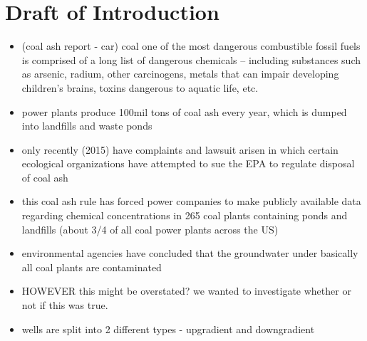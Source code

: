 \documentclass[12pt, twoside]{amherstthesis}
\begin{document}
\hypertarget{draft-of-introduction}{%
\section{Draft of Introduction}\label{draft-of-introduction}}
\begin{itemize}
\item
  (coal ash report - car) coal one of the most dangerous combustible fossil fuels is comprised of a long list of dangerous chemicals -- including substances such as arsenic, radium, other carcinogens, metals that can impair developing children's brains, toxins dangerous to aquatic life, etc.
\item
  power plants produce 100mil tons of coal ash every year, which is dumped into landfills and waste ponds
\item
  only recently (2015) have complaints and lawsuit arisen in which certain ecological organizations have attempted to sue the EPA to regulate disposal of coal ash
\item
  this coal ash rule has forced power companies to make publicly available data regarding chemical concentrations in 265 coal plants containing ponds and landfills (about 3/4 of all coal power plants across the US)
\item
  environmental agencies have concluded that the groundwater under basically all coal plants are contaminated
\item
  HOWEVER this might be overstated? we wanted to investigate whether or not if this was true.
\item
  wells are split into 2 different types - upgradient and downgradient
\end{itemize}
\end{document}
